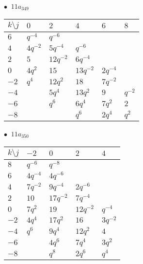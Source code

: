 \begin{minipage}{\linewidth}
$\bullet\ $ $11a_{349}$ \vspace{0.5em} \\
\begin{tabular}{l|lllll}
$k \setminus j$ & $0$ & $2$ & $4$ & $6$ & $8$ \\
\hline
$6$ & $q^{-4}$ & $q^{-6}$ &  &  &  \\
$4$ & $4q^{-2}$ & $5q^{-4}$ & $q^{-6}$ &  &  \\
$2$ & $5$ & $12q^{-2}$ & $6q^{-4}$ &  &  \\
$0$ & $4q^{2}$ & $15$ & $13q^{-2}$ & $2q^{-4}$ &  \\
$-2$ & $q^{4}$ & $12q^{2}$ & $18$ & $7q^{-2}$ &  \\
$-4$ &  & $5q^{4}$ & $13q^{2}$ & $9$ & $q^{-2}$ \\
$-6$ &  & $q^{6}$ & $6q^{4}$ & $7q^{2}$ & $2$ \\
$-8$ &  &  & $q^{6}$ & $2q^{4}$ & $q^{2}$ \\
\end{tabular}
\vspace{2em}
\end{minipage}
%
\begin{minipage}{\linewidth}
$\bullet\ $ $11a_{350}$ \vspace{0.5em} \\
\begin{tabular}{l|llll}
$k \setminus j$ & $-2$ & $0$ & $2$ & $4$ \\
\hline
$8$ & $q^{-6}$ & $q^{-8}$ &  &  \\
$6$ & $4q^{-4}$ & $4q^{-6}$ &  &  \\
$4$ & $7q^{-2}$ & $9q^{-4}$ & $2q^{-6}$ &  \\
$2$ & $10$ & $17q^{-2}$ & $7q^{-4}$ &  \\
$0$ & $7q^{2}$ & $19$ & $12q^{-2}$ & $q^{-4}$ \\
$-2$ & $4q^{4}$ & $17q^{2}$ & $16$ & $3q^{-2}$ \\
$-4$ & $q^{6}$ & $9q^{4}$ & $12q^{2}$ & $4$ \\
$-6$ &  & $4q^{6}$ & $7q^{4}$ & $3q^{2}$ \\
$-8$ &  & $q^{8}$ & $2q^{6}$ & $q^{4}$ \\
\end{tabular}
\vspace{2em}
\end{minipage}
%
